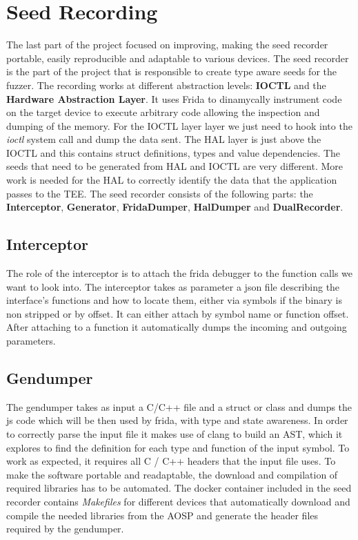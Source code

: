 \documentclass[a4paper,11pt,oneside]{article}
\begin{document}
\section{Seed Recording}
\label{sub:seedrecorder}
The last part of the project focused on improving, making the seed
recorder portable, easily reproducible and adaptable to various devices.
The seed recorder is the part of the project that is
responsible to create type aware seeds for the fuzzer.
The recording works at different abstraction levels:
\textbf{IOCTL} and the \textbf{Hardware Abstraction Layer}.
It uses Frida to dinamycally instrument code on the target device to execute arbitrary code allowing the inspection and dumping of the memory.
For the IOCTL layer
layer we just need to hook into the \emph{ioctl} system
call and dump the data sent.
The HAL layer is just above the IOCTL and this contains struct definitions, types and value dependencies.
The seeds that need to be generated from HAL and IOCTL are very different. More work is needed for the HAL to correctly identify the data that the
application passes to the TEE.
The seed recorder consists of the following parts: the \textbf{Interceptor}, \textbf{Generator}, \textbf{FridaDumper}, \textbf{HalDumper} and \textbf{DualRecorder}.
\subsection{Interceptor}
The role of the interceptor is to attach the frida debugger to the function calls we want to look into.
The interceptor takes as parameter a json file describing
the interface's functions and how to locate them, either via symbols if the binary is non stripped or by offset.
It can either attach by symbol name or function offset.
After attaching to a function it automatically dumps the incoming and outgoing parameters.
\label{sec:Gendumper}
\subsection{Gendumper}
The gendumper takes as input a C/C++ file and a struct or class and dumps the js code which will be then used by frida, with type and state awareness. In order to correctly parse the input file it makes use of clang to build an
AST, which it explores to find the definition for each type and function of the input symbol. To work as
expected, it requires all C / C++ headers that the input file uses. To make the software portable and readaptable, the download and compilation of required libraries has to be automated. The docker container included in the seed recorder contains \emph{Makefiles} for different devices that automatically download and compile the needed libraries from the AOSP and generate the header files required by the gendumper.
\end{document}
